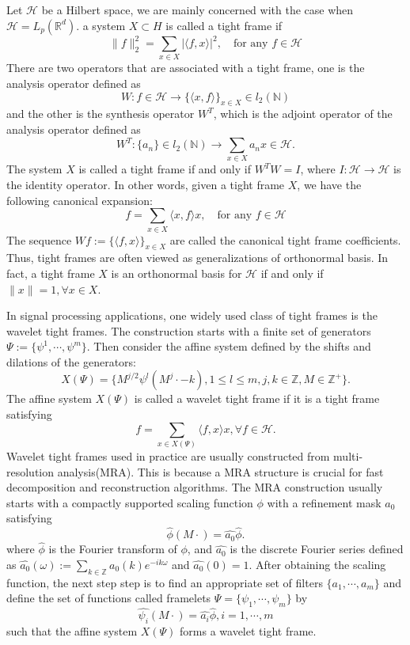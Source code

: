 \documentclass[a4paper]{article}
\begin{document}
Let $\mathcal{H}$ be a Hilbert space, we are mainly concerned with the case when $\mathcal{H}=L_p(\mathbb{R}^d)$. a system $X\subset H$ is called a tight frame if
\[
\|f\|_2^2 = \sum_{x\in X} |\langle f,x\rangle |^2, \quad \textrm{for any } f\in \mathcal{H}
\]
There are two operators that are associated with a tight frame, one is the analysis operator defined as
\[
W: f\in \mathcal{H} \rightarrow \{\langle x,f\rangle\}_{x\in X} \in l_2(\mathbb{N})
\]
and the other is the synthesis operator $W^T$, which is the adjoint operator of the analysis operator defined as
\[
W^T : \{a_n\} \in l_2(\mathbb{N}) \rightarrow \sum_{x\in X} a_n x\in \mathcal{H}.
\]
The system $X$ is called a tight frame if and only if $W^TW=I$, where $I: \mathcal{H} \rightarrow \mathcal{H}$ is the identity operator. In other words, given a tight frame $X$, we have the following canonical expansion:
\[
f=\sum_{x\in X} \langle x,f\rangle x, \quad \textrm{for any } f\in \mathcal{H}
\]
The sequence $Wf:=\{\langle f,x\rangle \}_{x\in X}$ are called the canonical tight frame coefficients. Thus, tight frames are often viewed as generalizations of orthonormal basis. In fact, a tight frame $X$ is an orthonormal basis for $\mathcal{H}$ if and only if $\|x\|=1,\forall x\in X$.

In signal processing applications, one widely used class of tight frames is the wavelet tight frames. The construction starts with a finite set of generators $\Psi:=\{\psi^1,\cdots,\psi^m\}$. Then consider the affine system defined by the shifts and dilations of the generators:
\[
X(\Psi)=\{M^{j/2}\psi^{l}(M^j\cdot -k),1\leq l\leq m, j,k\in\mathbb{Z}, M\in\mathbb{Z^+}\}.
\]
The affine system $X(\Psi)$ is called a wavelet tight frame if it is a tight frame satisfying
\[
f=\sum_{x\in X(\Psi)} \langle f,x\rangle x, \forall f \in \mathcal{H}.
\]
Wavelet tight frames used in practice are usually constructed from multi-resolution analysis(MRA). This is because a MRA structure is crucial for fast decomposition and reconstruction algorithms.  The MRA construction usually starts with a compactly supported scaling function $\phi$ with a refinement mask  $a_0$ satisfying
\[
\hat{\phi}(M\cdot)=\hat{a_0}\hat{\phi}.
\]
where $\hat{\phi}$ is the Fourier transform of $\phi$, and $\hat{a_0}$ is the discrete Fourier series defined as $\hat{a_0}(\omega):=\sum_{k\in\mathbb{Z}} a_0(k) e^{-ik\omega}$ and $\hat{a_0}(0)=1$. After obtaining the scaling function, the next step step is to find an appropriate set of filters $\{a_1,\cdots,a_m\}$ and define the set of functions called framelets $\Psi=\{\psi_1,\cdots,\psi_m\}$ by
\[
\hat{\psi_i}(M\cdot) = \hat{a_i}\hat{\phi},i=1,\cdots,m
\]
such that the affine system $X(\Psi)$ forms a wavelet tight frame. 
\end{document}
